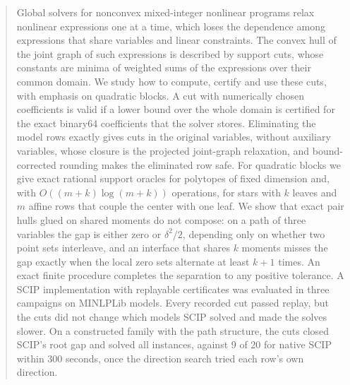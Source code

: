 \begin{abstract}
Global solvers for nonconvex mixed-integer nonlinear programs relax
nonlinear expressions one at a time, which loses the dependence among
expressions that share variables and linear constraints. The convex hull of
the joint graph of such expressions is described by support cuts, whose
constants are minima of weighted sums of the expressions over their common
domain. We study how to compute, certify and use these cuts, with emphasis
on quadratic blocks. A cut with numerically chosen coefficients is valid if
a lower bound over the whole domain is certified for the exact binary64
coefficients that the solver stores. Eliminating the model rows exactly
gives cuts in the original variables, without auxiliary variables, whose
closure is the projected joint-graph relaxation, and bound-corrected
rounding makes the eliminated row safe. For quadratic blocks we give exact
rational support oracles for polytopes of fixed dimension and, with
$O((m+k)\log(m+k))$ operations, for stars with $k$ leaves and $m$ affine rows
that couple the center with one leaf. We show that exact pair hulls glued
on shared moments do not compose: on a path of three variables the gap is
either zero or $\delta^2/2$, depending only on whether two point sets
interleave, and an interface that shares $k$ moments misses the gap exactly
when the local zero sets alternate at least $k+1$ times. An exact finite
procedure completes the separation to any positive tolerance. A SCIP
implementation with replayable certificates was evaluated in three
campaigns on MINLPLib models. Every recorded cut passed replay, but the
cuts did not change which models SCIP solved and made the solves slower.
On a constructed family with the path structure, the cuts closed SCIP's
root gap and solved all instances, against 9 of 20 for native SCIP within
300 seconds, once the direction search tried each row's own direction.
\end{abstract}
